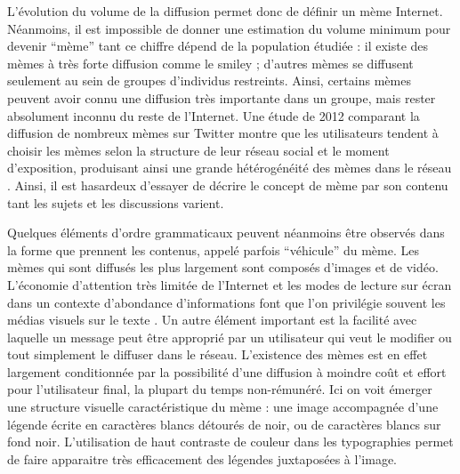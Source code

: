 L{\textquoteright}évolution du volume de la diffusion permet donc de définir un mème Internet. Néanmoins, il est impossible de donner une estimation du volume minimum pour devenir {\textquotedblleft}mème{\textquotedblright} tant ce chiffre dépend de la population étudiée : il existe des mèmes à très forte diffusion comme le smiley ; d{\textquoteright}autres mèmes se diffusent seulement au sein de groupes d{\textquoteright}individus restreints. Ainsi, certains mèmes peuvent avoir connu une diffusion très importante dans un groupe, mais rester absolument inconnu du reste de l{\textquoteright}Internet. Une étude de 2012 comparant la diffusion de nombreux mèmes sur Twitter montre que les utilisateurs tendent à choisir les mèmes selon la structure de leur réseau social et le moment d{\textquoteright}exposition, produisant ainsi une grande hétérogénéité des mèmes dans le réseau \citep{Weng2012}. Ainsi, il est hasardeux d{\textquoteright}essayer de décrire le concept de mème par son contenu tant les sujets et les discussions varient. 

Quelques éléments d{\textquoteright}ordre grammaticaux peuvent néanmoins être observés dans la forme que prennent les contenus, appelé parfois {\textquotedblleft}véhicule{\textquotedblright} du mème. Les mèmes qui sont diffusés les plus largement sont composés d{\textquoteright}images et de vidéo. L{\textquoteright}économie d{\textquoteright}attention très limitée de l{\textquoteright}Internet et les modes de lecture sur écran dans un contexte d{\textquoteright}abondance d{\textquoteright}informations font que l{\textquoteright}on privilégie souvent les médias visuels sur le texte \citep{Goldhaber2006}. Un autre élément important est la facilité avec laquelle un message peut être approprié par un utilisateur qui veut le modifier ou tout simplement le diffuser dans le réseau. L{\textquoteright}existence des mèmes est en effet largement conditionnée par la possibilité d{\textquoteright}une diffusion à moindre co\^ut et effort pour l{\textquoteright}utilisateur final, la plupart du temps non-rémunéré. Ici on voit émerger une structure visuelle caractéristique du mème : une image accompagnée d{\textquoteright}une légende écrite en caractères blancs détourés de noir, ou de caractères blancs sur fond noir. L{\textquoteright}utilisation de haut contraste de couleur dans les typographies permet de faire apparaitre très efficacement des légendes juxtaposées à l{\textquoteright}image.

